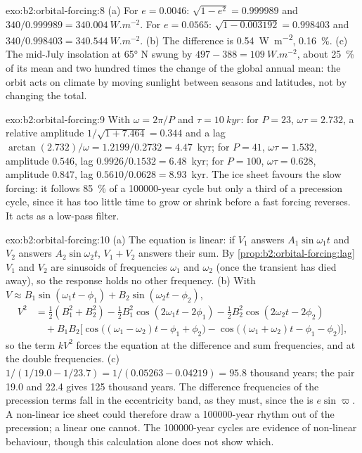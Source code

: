 \begin{solution}{exo:b2:orbital-forcing:8}
(a) For $e = 0.0046$: $\sqrt{1 - e^2} = 0.999989$ and $340/0.999989 = \qty{340.004}{W.m^{-2}}$. For
$e = 0.0565$: $\sqrt{1 - 0.003192} = 0.998403$ and $340/0.998403 = \qty{340.544}{W.m^{-2}}$. (b) The
difference is \qty{0.54}{W.m^{-2}}, \qty{0.16}{\percent}. (c) The mid-July insolation at \ang{65} N
swung by $497 - 388 = \qty{109}{W.m^{-2}}$, about \qty{25}{\percent} of its mean and two hundred
times the change of the global annual mean: the orbit acts on climate by moving sunlight between
seasons and latitudes, not by changing the total.
\end{solution}

\begin{solution}{exo:b2:orbital-forcing:9}
With $\omega = 2\pi/P$ and $\tau = \qty{10}{kyr}$: for $P = 23$, $\omega\tau = 2.732$, a relative
amplitude $1/\sqrt{1 + 7.464} = 0.344$ and a lag $\arctan(2.732)/\omega = 1.2199/0.2732 = 4.47$~kyr;
for $P = 41$, $\omega\tau = 1.532$, amplitude $0.546$, lag $0.9926/0.1532 = 6.48$~kyr; for $P =
100$, $\omega\tau = 0.628$, amplitude $0.847$, lag $0.5610/0.0628 = 8.93$~kyr. The ice sheet
favours the slow forcing: it follows \qty{85}{\percent} of a \num{100000}-year cycle but only a
third of a precession cycle, since it has too little time to grow or shrink before a fast forcing
reverses. It acts as a low-pass filter.
\end{solution}

\begin{solution}{exo:b2:orbital-forcing:10}
(a) The equation is linear: if $V_1$ answers $A_1\sin\omega_1t$ and $V_2$ answers
$A_2\sin\omega_2t$, $V_1 + V_2$ answers their sum. By \cref{prop:b2:orbital-forcing:lag} $V_1$ and
$V_2$ are sinusoids of frequencies $\omega_1$ and $\omega_2$ (once the transient has died away), so
the response holds no other frequency. (b) With $V \approx B_1\sin(\omega_1t - \phi_1) +
B_2\sin(\omega_2t - \phi_2)$,
\[
\begin{aligned}
  V^2 &= \tfrac12(B_1^2 + B_2^2) - \tfrac12B_1^2\cos(2\omega_1t - 2\phi_1) -
  \tfrac12B_2^2\cos(2\omega_2t - 2\phi_2)\\
  &\quad + B_1B_2\bigl[\cos\bigl((\omega_1 - \omega_2)t - \phi_1 + \phi_2\bigr) -
  \cos\bigl((\omega_1 + \omega_2)t - \phi_1 - \phi_2\bigr)\bigr],
\end{aligned}
\]
so the term $kV^2$ forces the equation at the difference and sum frequencies, and at the double
frequencies. (c) $1/(1/19.0 - 1/23.7) = 1/(0.05263 - 0.04219) = 95.8$ thousand years; the pair 19.0
and 22.4 gives 125 thousand years. The difference frequencies of the precession terms fall in the
eccentricity band, as they must, since the  is $e\sin\varpi$. A non-linear
ice sheet could therefore draw a \num{100000}-year rhythm out of the precession; a linear one
cannot. The \num{100000}-year cycles are evidence of non-linear behaviour, though this calculation
alone does not show which.
\end{solution}

